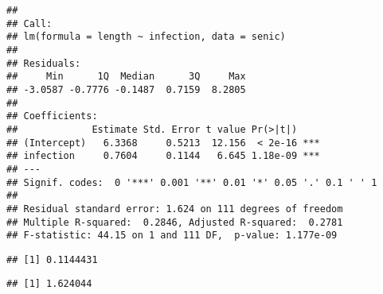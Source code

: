 \documentclass[
]{article}
\newenvironment{Shaded}{\begin{snugshade}}{\end{snugshade}}
\newcommand{\CommentTok}[1]{\textcolor[rgb]{0.56,0.35,0.01}{\textit{#1}}}
\newcommand{\DecValTok}[1]{\textcolor[rgb]{0.00,0.00,0.81}{#1}}
\newcommand{\FunctionTok}[1]{\textcolor[rgb]{0.13,0.29,0.53}{\textbf{#1}}}
\newcommand{\NormalTok}[1]{#1}
\newcommand{\SpecialCharTok}[1]{\textcolor[rgb]{0.81,0.36,0.00}{\textbf{#1}}}
\newcommand{\StringTok}[1]{\textcolor[rgb]{0.31,0.60,0.02}{#1}}
\begin{document}
\begin{verbatim}
## 
## Call:
## lm(formula = length ~ infection, data = senic)
## 
## Residuals:
##     Min      1Q  Median      3Q     Max 
## -3.0587 -0.7776 -0.1487  0.7159  8.2805 
## 
## Coefficients:
##             Estimate Std. Error t value Pr(>|t|)    
## (Intercept)   6.3368     0.5213  12.156  < 2e-16 ***
## infection     0.7604     0.1144   6.645 1.18e-09 ***
## ---
## Signif. codes:  0 '***' 0.001 '**' 0.01 '*' 0.05 '.' 0.1 ' ' 1
## 
## Residual standard error: 1.624 on 111 degrees of freedom
## Multiple R-squared:  0.2846, Adjusted R-squared:  0.2781 
## F-statistic: 44.15 on 1 and 111 DF,  p-value: 1.177e-09
\end{verbatim}

\begin{Shaded}
\end{Shaded}

\begin{verbatim}
## [1] 0.1144431
\end{verbatim}

\begin{Shaded}
\end{Shaded}

\begin{verbatim}
## [1] 1.624044
\end{verbatim}

\begin{Shaded}
\end{Shaded}
\end{document}
